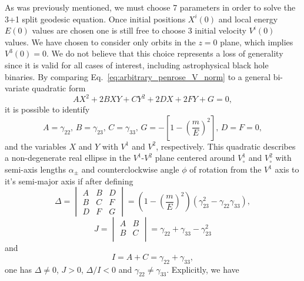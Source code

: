 As was previously mentioned, we must choose 7 parameters in order to solve the 3+1 split geodesic equation. Once initial positions $X^i(0)$ and local energy $E(0)$ values are chosen one is still free to choose 3 initial velocity $V^i(0)$ values. We have chosen to consider only orbits in the $z=0$ plane, which implies $V^3(0)=0$. We do not believe that this choice represents a loss of generality since it is valid for all cases of interest, including astrophysical black hole binaries. By comparing Eq.~\eqref{eq:arbitrary_penrose_V_norm} to a general bi-variate quadratic form
%
\begin{equation}
  A X^2 + 2 B X Y + C Y^2 + 2 D X + 2 F Y + G = 0,
  \label{eq:arbitrary_penrose_general_quadratic_form}
\end{equation}
%
it is possible to identify
%
\begin{equation}
  A = \gamma_{22},\, B = \gamma_{23},\, C = \gamma_{33},\, G = -\left[ 1 - \left( \frac{m}{E} \right)^2 \right],\, D = F = 0,
\end{equation}
%
and the variables $X$ and $Y$ with $V^1$ and $V^2$, respectively. This quadratic describes a non-degenerate real ellipse in the $V^1$-$V^2$ plane centered around $V^1_\circ$ and $V^2_\circ$ with semi-axis lengths $\alpha_\pm$ and counterclockwise angle $\phi$ of rotation from the $V^1$ axis to it's semi-major axis if after defining~\cite{Hart2002}
%
\begin{equation}
  \Delta = 
  \begin{vmatrix}
    A & B & D  \\
    B & C & F  \\
    D & F & G
  \end{vmatrix}
  = \left( 1 - \left( \frac{m}{E} \right)^2 \right) \left(\gamma_{23}^2-\gamma_{22} \gamma_{33}\right)
  \label{eq:arbitrary_penrose_quadratic_determinant}
  ,
\end{equation}
%
\begin{equation}
  J = 
  \begin{vmatrix}
    A & B \\
    B & C \\
  \end{vmatrix}
  = \gamma_{22} + \gamma_{33} - \gamma_{23}^2
  \label{eq:arbitrary_penrose_quadratic_J}
\end{equation}
%
and
%
\begin{equation}
  I = A + C = \gamma_{22} + \gamma_{33},
  \label{eq:arbitrary_penrose_quadratic_I}
\end{equation}
%
one has $\Delta \neq 0$, $J > 0$, $\Delta/I < 0$ and $\gamma_{22} \neq \gamma_{33}$. Explicitly, we have~\cite{Larson2006, Young2010, Lawrence2014}
